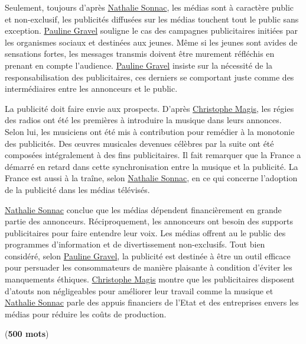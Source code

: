 \documentclass[11pt]{article}
\begin{document}
Seulement, toujours d’après \underline{Nathalie Sonnac}, les médias sont à caractère public et non-exclusif, les publicités diffusées sur les médias touchent tout le public sans exception. \underline{Pauline Gravel} souligne le cas des campagnes publicitaires initiées par les organismes sociaux et destinées aux jeunes. Même si les jeunes sont avides de sensations fortes, les messages transmis doivent être murement réfléchis en prenant en compte l’audience. \underline{Pauline Gravel} insiste sur la nécessité de la responsabilisation des publicitaires, ces derniers se comportant juste comme des intermédiaires entre les annonceurs et le public.

La publicité doit faire envie aux prospects. D’après \underline{Christophe Magis}, les régies des radios ont été les premières à introduire la musique dans leurs annonces. Selon lui, les musiciens ont été mis à contribution pour remédier à la monotonie des publicités. Des \oe uvres musicales devenues célèbres par la suite ont été composées intégralement à des fins publicitaires. Il fait remarquer que la France a démarré en retard dans cette synchronisation entre la musique et la publicité. La France est aussi à la traîne, selon \underline{Nathalie Sonnac}, en ce qui concerne l’adoption de la publicité dans les médias télévisés.

\underline{Nathalie Sonnac} conclue que les médias dépendent financièrement en grande partie des annonceurs. Réciproquement, les annonceurs ont besoin des supports publicitaires pour faire entendre leur voix. Les médias offrent au le public des programmes d'information et de divertissement non-exclusifs.
 Tout bien considéré, selon \underline{Pauline Gravel}, la publicité est destinée à être un outil efficace pour persuader les consommateurs de manière plaisante à condition d'éviter les manquements éthiques. \underline{Christophe Magis} montre que les publicitaires disposent d’atouts non négligeables pour améliorer leur travail comme la musique et \underline{Nathalie Sonnac} parle des appuis financiers de l’Etat et des entreprises envers les médias pour réduire les coûts de production.

(\textbf{500 mots})

\newpage
\end{document}
